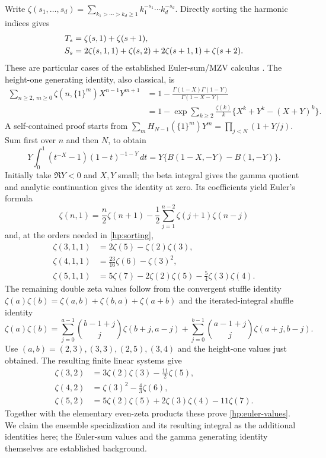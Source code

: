 \documentclass[11pt,a4paper]{article}
\theoremstyle{definition}
\theoremstyle{remark}
\numberwithin{equation}{section}
\begin{document}
Write
$\zeta(s_1,\ldots,s_d)=\sum_{k_1>\cdots>k_d\ge1}
k_1^{-s_1}\cdots k_d^{-s_d}$. Directly sorting the harmonic
indices gives
\begin{align}
 T_s&=\zeta(s,1)+\zeta(s+1),\notag\\
 S_s&=2\zeta(s,1,1)+\zeta(s,2)
                       +2\zeta(s+1,1)+\zeta(s+2).
 \label{hp:sorting}
\end{align}
These are particular cases of the established Euler-sum/MZV
calculus \cite{Xu2017,XuWang2019}. The height-one generating
identity, also classical, is
\begin{equation}\label{hp:height-one}
\begin{aligned}
 \sum_{n\ge2,\ m\ge0}\zeta(n,\{1\}^m)X^{n-1}Y^{m+1}
 &=1-\frac{\Gamma(1-X)\Gamma(1-Y)}{\Gamma(1-X-Y)}\\
 &=1-\exp\!\sum_{k\ge2}\frac{\zeta(k)}k
                   \{X^k+Y^k-(X+Y)^k\}.
\end{aligned}
\end{equation}
A self-contained proof starts from
$\sum_mH_{N-1}(\{1\}^m)Y^m=\prod_{j<N}(1+Y/j)$.
Sum first over $n$ and then $N$, to obtain
\[
 Y\int_0^1(t^{-X}-1)(1-t)^{-1-Y}\,dt
 =Y\{B(1-X,-Y)-B(1,-Y)\}.
\]
Initially take $\Re Y<0$ and $X,Y$ small; the beta integral
gives the gamma quotient and analytic continuation gives the
identity at zero. Its coefficients yield Euler's formula
\[
 \zeta(n,1)=\frac n2\zeta(n+1)
        -\frac12\sum_{j=1}^{n-2}\zeta(j+1)\zeta(n-j)
\]
and, at the orders needed in \eqref{hp:sorting},
\begin{align*}
 \zeta(3,1,1)&=2\zeta(5)-\zeta(2)\zeta(3),\\
 \zeta(4,1,1)&=\tfrac{23}{16}\zeta(6)-\zeta(3)^2,\\
 \zeta(5,1,1)&=5\zeta(7)-2\zeta(2)\zeta(5)
                                     -\tfrac54\zeta(3)\zeta(4).
\end{align*}
The remaining double zeta values follow from the convergent
stuffle identity
$\zeta(a)\zeta(b)=\zeta(a,b)+\zeta(b,a)+\zeta(a+b)$
and the iterated-integral shuffle identity
\[
 \zeta(a)\zeta(b)=
 \sum_{j=0}^{a-1}\binom{b-1+j}{j}\zeta(b+j,a-j)
 +\sum_{j=0}^{b-1}\binom{a-1+j}{j}\zeta(a+j,b-j).
\]
Use $(a,b)=(2,3),(3,3),(2,5),(3,4)$ and the height-one
values just obtained. The resulting finite linear systems give
\begin{align*}
 \zeta(3,2)&=3\zeta(2)\zeta(3)-\tfrac{11}{2}\zeta(5),\\
 \zeta(4,2)&=\zeta(3)^2-\tfrac43\zeta(6),\\
 \zeta(5,2)&=5\zeta(2)\zeta(5)+2\zeta(3)\zeta(4)-11\zeta(7).
\end{align*}
Together with the elementary even-zeta products these prove
\eqref{hp:euler-values}. We claim the ensemble specialization
and its resulting integral as the additional identities here;
the Euler-sum values and the gamma generating identity themselves
are established background.
\end{document}
